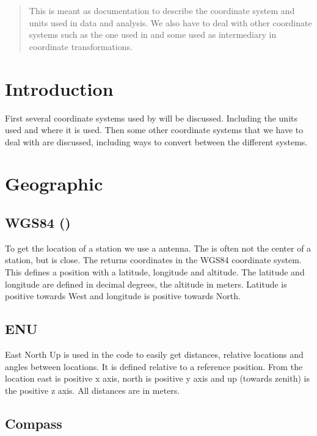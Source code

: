 \begin{abstract}

This is meant as documentation to describe the coordinate system and
units used in \hisparc data and analysis. We also have to deal with
other coordinate systems such as the one used in \corsika and some used
as intermediary in coordinate transformations.

\end{abstract}


\section{Introduction}

First several coordinate systems used by \hisparc will be discussed.
Including the units used and where it is used. Then some other
coordinate systems that we have to deal with are discussed, including
ways to convert between the different systems.


\section{Geographic}

\subsection{WGS84 (\gps)}

To get the location of a station we use a \gps antenna. The \gps is
often not the center of a station, but is close. The \gps returns
coordinates in the WGS84 coordinate system. This defines a position with
a latitude, longitude and altitude. The latitude and longitude are
defined in decimal degrees, the altitude in meters. Latitude is positive towards West and longitude is positive towards North.


\subsection{ENU}

East North Up is used in the code to easily get distances, relative locations and angles between locations. It is defined relative to a reference position. From the location east is positive x axis, north is positive y axis and up (towards zenith) is the positive z axis. All distances are in meters.


\subsection{Compass}

